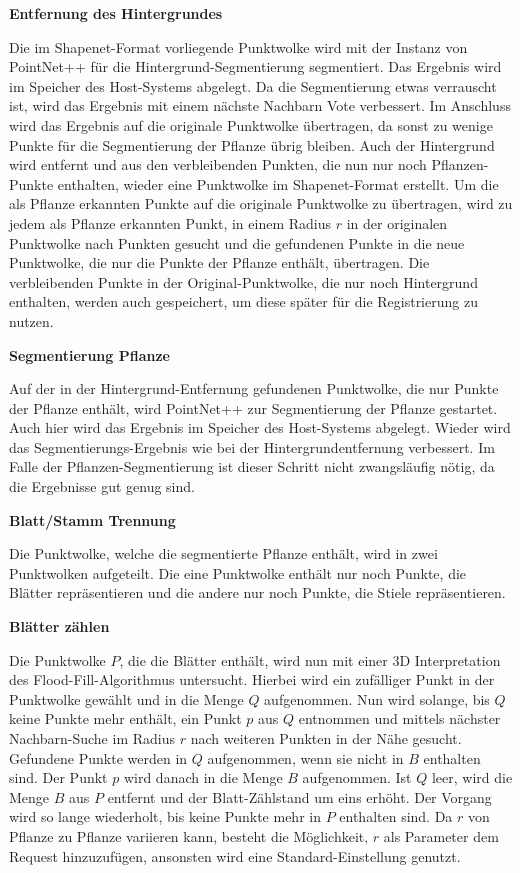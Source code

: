 \documentclass[12pt,titlepage, twoside]{article}
\begin{document}
\textbf{Entfernung des Hintergrundes}

Die im Shapenet-Format vorliegende Punktwolke wird mit der Instanz von PointNet++ für die Hintergrund-Segmentierung segmentiert. Das Ergebnis wird im Speicher des Host-Systems abgelegt.
Da die Segmentierung etwas verrauscht ist, wird das Ergebnis mit einem \grqq{}nächste Nachbarn Vote\grqq{} verbessert.
Im Anschluss wird das Ergebnis auf die originale Punktwolke übertragen, da sonst zu wenige Punkte für die Segmentierung der Pflanze übrig bleiben.
Auch der Hintergrund wird entfernt und aus den verbleibenden Punkten, die nun nur noch Pflanzen-Punkte enthalten, wieder eine Punktwolke im Shapenet-Format erstellt.
Um die als Pflanze erkannten Punkte auf die originale Punktwolke zu übertragen, wird zu jedem als Pflanze erkannten Punkt, in einem Radius $r$ in der originalen Punktwolke nach Punkten gesucht 
und die gefundenen Punkte in die neue Punktwolke, die nur die Punkte der Pflanze enthält, übertragen. 
Die verbleibenden Punkte in der Original-Punktwolke, die nur noch Hintergrund enthalten, werden auch gespeichert, um diese später für die Registrierung zu nutzen.

\textbf{Segmentierung Pflanze}

Auf der in der Hintergrund-Entfernung gefundenen Punktwolke, die nur Punkte der Pflanze enthält, wird PointNet++ zur Segmentierung der Pflanze gestartet. Auch hier wird das Ergebnis im Speicher des Host-Systems abgelegt. 
Wieder wird das Segmentierungs-Ergebnis wie bei der Hintergrundentfernung verbessert. Im Falle der Pflanzen-Segmentierung ist dieser Schritt nicht zwangsläufig nötig, da die Ergebnisse gut genug sind.

\textbf{Blatt/Stamm Trennung}

Die Punktwolke, welche die segmentierte Pflanze enthält, wird in zwei Punktwolken aufgeteilt. 
Die eine Punktwolke enthält nur noch Punkte, die Blätter repräsentieren und die andere nur noch Punkte, die Stiele repräsentieren.

\textbf{Blätter zählen}

Die Punktwolke $P$, die die Blätter enthält, wird nun mit einer 3D Interpretation des Flood-Fill-Algorithmus untersucht. 
Hierbei wird ein zufälliger Punkt in der Punktwolke gewählt und in die Menge $Q$ aufgenommen.
Nun wird solange, bis $Q$ keine Punkte mehr enthält, ein Punkt $p$ aus $Q$ entnommen und mittels nächster Nachbarn-Suche im Radius $r$ nach weiteren Punkten in der Nähe gesucht. 
Gefundene Punkte werden in $Q$ aufgenommen, wenn sie nicht in $B$ enthalten sind.
Der Punkt $p$ wird danach in die Menge $B$ aufgenommen. Ist $Q$ leer, wird die Menge $B$ aus $P$ entfernt und der Blatt-Zählstand um eins erhöht. 
Der Vorgang wird so lange wiederholt, bis keine Punkte mehr in $P$ enthalten sind.
Da $r$ von Pflanze zu Pflanze variieren kann, besteht die Möglichkeit, $r$ als Parameter dem Request hinzuzufügen, ansonsten wird eine Standard-Einstellung genutzt.
\end{document}
